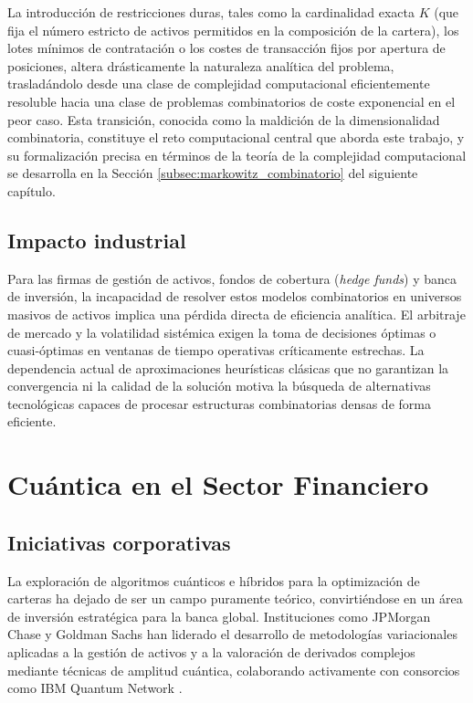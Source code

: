 La introducción de restricciones duras, tales como la cardinalidad exacta $K$ (que fija el número estricto de activos permitidos en la composición de la cartera), los lotes mínimos de contratación o los costes de transacción fijos por apertura de posiciones, altera drásticamente la naturaleza analítica del problema, trasladándolo desde una clase de complejidad computacional eficientemente resoluble hacia una clase de problemas combinatorios de coste exponencial en el peor caso. Esta transición, conocida como la maldición de la dimensionalidad combinatoria, constituye el reto computacional central que aborda este trabajo, y su formalización precisa en términos de la teoría de la complejidad computacional se desarrolla en la Sección \ref{subsec:markowitz_combinatorio} del siguiente capítulo.

\subsection{Impacto industrial}
Para las firmas de gestión de activos, fondos de cobertura (\textit{hedge funds}) y banca de inversión, la incapacidad de resolver estos modelos combinatorios en universos masivos de activos implica una pérdida directa de eficiencia analítica. El arbitraje de mercado y la volatilidad sistémica exigen la toma de decisiones óptimas o cuasi-óptimas en ventanas de tiempo operativas críticamente estrechas. La dependencia actual de aproximaciones heurísticas clásicas que no garantizan la convergencia ni la calidad de la solución motiva la búsqueda de alternativas tecnológicas capaces de procesar estructuras combinatorias densas de forma eficiente.

\section{Cuántica en el Sector Financiero}
\label{sec:cuantica_sector_financiero}

\subsection{Iniciativas corporativas}
La exploración de algoritmos cuánticos e híbridos para la optimización de carteras ha dejado de ser un campo puramente teórico, convirtiéndose en un área de inversión estratégica para la banca global. Instituciones como JPMorgan Chase y Goldman Sachs han liderado el desarrollo de metodologías variacionales aplicadas a la gestión de activos y a la valoración de derivados complejos mediante técnicas de amplitud cuántica, colaborando activamente con consorcios como IBM Quantum Network \cite{Egger2020,Rebentrost2018}.

